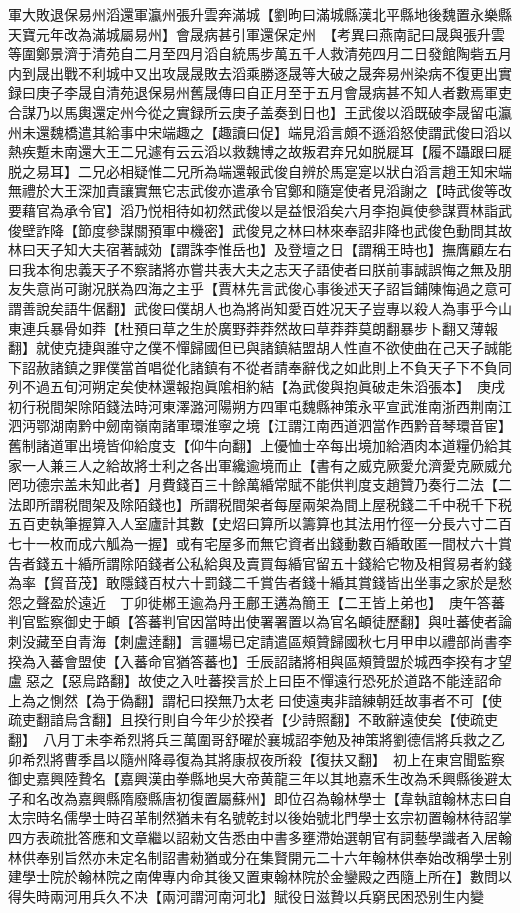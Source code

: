 軍大敗退保易州滔還軍瀛州張升雲奔滿城【劉昫曰滿城縣漢北平縣地後魏置永樂縣天寶元年改為滿城屬易州】會晟病甚引軍還保定州　【考異曰燕南記曰晟與張升雲等圍鄭景濟于清苑自二月至四月滔自統馬步萬五千人救清苑四月二日發館陶砦五月内到晟出戰不利城中又出攻晟晟敗去滔乘勝逐晟等大破之晟奔易州染病不復更出實録曰庚子李晟自清苑退保易州舊晟傳曰自正月至于五月會晟病甚不知人者數焉軍吏合謀乃以馬輿還定州今從之實録所云庚子盖奏到日也】王武俊以滔既破李晟留屯瀛州未還魏橋遣其給事中宋端趣之【趣讀曰促】端見滔言頗不遜滔怒使謂武俊曰滔以熱疾蹔未南還大王二兄遽有云云滔以救魏博之故叛君弃兄如脱屣耳【履不躡跟曰屣脱之易耳】二兄必相疑惟二兄所為端還報武俊自辨於馬寔寔以狀白滔言趙王知宋端無禮於大王深加責讓實無它志武俊亦遣承令官鄭和隨寔使者見滔謝之【時武俊等改要藉官為承令官】滔乃悦相待如初然武俊以是益恨滔矣六月李抱眞使參謀賈林詣武俊壁詐降【節度參謀關預軍中機密】武俊見之林曰林來奉詔非降也武俊色動問其故林曰天子知大夫宿著誠効【謂誅李惟岳也】及登壇之日【謂稱王時也】撫膺顧左右曰我本徇忠義天子不察諸將亦嘗共表大夫之志天子語使者曰朕前事誠誤悔之無及朋友失意尚可謝况朕為四海之主乎【賈林先言武俊心事後述天子詔旨鋪陳悔過之意可謂善說矣語牛倨翻】武俊曰僕胡人也為將尚知愛百姓况天子豈專以殺人為事乎今山東連兵暴骨如莽【杜預曰草之生於廣野莽莽然故曰草莽莽莫朗翻暴步卜翻又薄報翻】就使克捷與誰守之僕不憚歸國但已與諸鎮結盟胡人性直不欲使曲在己天子誠能下詔赦諸鎮之罪僕當首唱從化諸鎮有不從者請奉辭伐之如此則上不負天子下不負同列不過五旬河朔定矣使林還報抱眞隂相約結【為武俊與抱眞破走朱滔張本】　庚戌初行税間架除陌錢法時河東澤潞河陽朔方四軍屯魏縣神策永平宣武淮南浙西荆南江泗沔鄂湖南黔中劒南嶺南諸軍環淮寧之境【江謂江南西道泗當作西黔音琴環音宦】舊制諸道軍出境皆仰給度支【仰牛向翻】上優恤士卒每出境加給酒肉本道糧仍給其家一人兼三人之給故將士利之各出軍纔逾境而止【書有之威克厥愛允濟愛克厥威允罔功德宗盖未知此者】月費錢百三十餘萬緍常賦不能供判度支趙贊乃奏行二法【二法即所謂税間架及除陌錢也】所謂税間架者每屋兩架為間上屋税錢二千中税千下税五百吏執筆握算入人室廬計其數【史炤曰算所以籌算也其法用竹徑一分長六寸二百七十一枚而成六觚為一握】或有宅屋多而無它資者出錢動數百緍敢匿一間杖六十賞告者錢五十緍所謂除陌錢者公私給與及賣買每緍官留五十錢給它物及相貿易者約錢為率【貿音茂】敢隱錢百杖六十罰錢二千賞告者錢十緍其賞錢皆出坐事之家於是愁怨之聲盈於遠近　丁卯徙郴王逾為丹王鄜王遘為簡王【二王皆上弟也】　庚午答蕃判官監察御史于頔【答蕃判官因當時出使署署置以為官名頔徒歷翻】與吐蕃使者論刺没藏至自青海【刺盧逹翻】言疆場已定請遣區頰贊歸國秋七月甲申以禮部尚書李揆為入蕃會盟使【入蕃命官猶答蕃也】壬辰詔諸將相與區頰贊盟於城西李揆有才望盧惡之【惡烏路翻】故使之入吐蕃揆言於上曰臣不憚遠行恐死於道路不能逹詔命上為之惻然【為于偽翻】謂杞曰揆無乃太老曰使遠夷非諳練朝廷故事者不可【使疏吏翻諳烏含翻】且揆行則自今年少於揆者【少詩照翻】不敢辭遠使矣【使疏吏翻】　八月丁未李希烈將兵三萬圍哥舒曜於襄城詔李勉及神策將劉德信將兵救之乙卯希烈將曹季昌以隨州降尋復為其將康叔夜所殺【復扶又翻】　初上在東宫聞監察御史嘉興陸贄名【嘉興漢由拳縣地吳大帝黄龍三年以其地嘉禾生改為禾興縣後避太子和名改為嘉興縣隋廢縣唐初復置屬蘇州】即位召為翰林學士【韋執誼翰林志曰自太宗時名儒學士時召革制然猶未有名號乾封以後始號北門學士玄宗初置翰林待詔掌四方表疏批答應和文章繼以詔勑文告悉由中書多壅滯始選朝官有詞藝學識者入居翰林供奉别旨然亦未定名制詔書勑猶或分在集賢開元二十六年翰林供奉始改稱學士别建學士院於翰林院之南俾專内命其後又置東翰林院於金鑾殿之西隨上所在】數問以得失時兩河用兵久不决【兩河謂河南河北】賦役日滋贄以兵窮民困恐别生内變